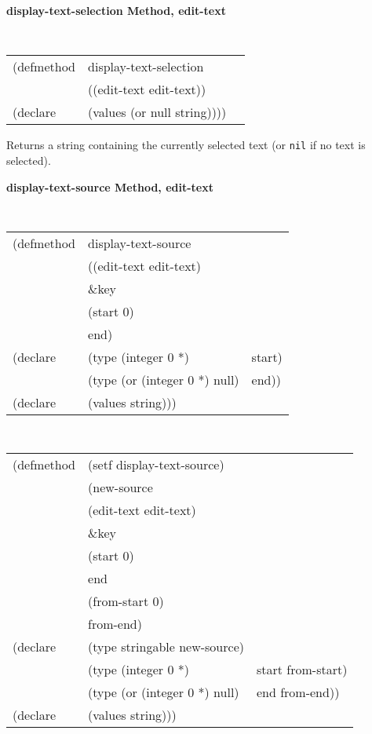 {\samepage  
{\large {\bf display-text-selection \hfill Method, edit-text}}
\begin{flushright} \parbox[t]{6.125in}{
\tt
\begin{tabular}{lll}
\raggedright
(defmethod & display-text-selection & \\
& ((edit-text  edit-text)) \\
(declare & (values (or null string))))
\end{tabular}
\rm

}\end{flushright}}



\begin{flushright} \parbox[t]{6.125in}{
Returns a string containing the currently selected text (or {\tt nil} if no text
is selected).} \end{flushright}

        
{\samepage  
{\large {\bf display-text-source \hfill Method, edit-text}}
\begin{flushright} \parbox[t]{6.125in}{
\tt
\begin{tabular}{lll}
\raggedright
(defmethod & display-text-source & \\
& ((edit-text  edit-text)\\
&  \&key \\
&   (start 0)\\
&   end) \\
(declare &(type (integer 0 *) & start)\\
         &(type (or (integer 0 *) null) & end))\\
(declare & (values string)))
\end{tabular}
\rm

}\end{flushright}}

{\samepage
\begin{flushright} \parbox[t]{6.125in}{
\tt
\begin{tabular}{lll}
\raggedright
(defmethod & (setf display-text-source) & \\
         & (new-source \\
         & (edit-text  edit-text)\\
&  \&key \\
&   (start 0)\\
&   end\\
&   (from-start 0)\\
&   from-end) \\
(declare &(type stringable  new-source)\\
        &(type (integer 0 *) & start from-start)\\
         &(type (or (integer 0 *) null) & end from-end))\\
(declare & (values string)))
\end{tabular}
\rm}
\end{flushright}}

